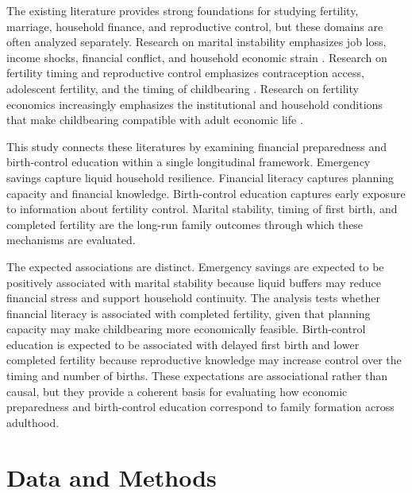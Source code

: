 \documentclass[12pt]{article}
\begin{document}
The existing literature provides strong foundations for studying fertility, marriage, household finance, and reproductive control, but these domains are often analyzed separately. Research on marital instability emphasizes job loss, income shocks, financial conflict, and household economic strain \citep{charles2004,hansen2005,nunley2010,dew2012,keldenich2022}. Research on fertility timing and reproductive control emphasizes contraception access, adolescent fertility, and the timing of childbearing \citep{goldin2002,bailey2010,kearney2009,lindberg2016,myers2017}. Research on fertility economics increasingly emphasizes the institutional and household conditions that make childbearing compatible with adult economic life \citep{doepke2022}.

This study connects these literatures by examining financial preparedness and birth-control education within a single longitudinal framework. Emergency savings capture liquid household resilience. Financial literacy captures planning capacity and financial knowledge. Birth-control education captures early exposure to information about fertility control. Marital stability, timing of first birth, and completed fertility are the long-run family outcomes through which these mechanisms are evaluated.

The expected associations are distinct. Emergency savings are expected to be positively associated with marital stability because liquid buffers may reduce financial stress and support household continuity. The analysis tests whether financial literacy is associated with completed fertility, given that planning capacity may make childbearing more economically feasible. Birth-control education is expected to be associated with delayed first birth and lower completed fertility because reproductive knowledge may increase control over the timing and number of births. These expectations are associational rather than causal, but they provide a coherent basis for evaluating how economic preparedness and birth-control education correspond to family formation across adulthood.


\section{Data and Methods}
\end{document}
